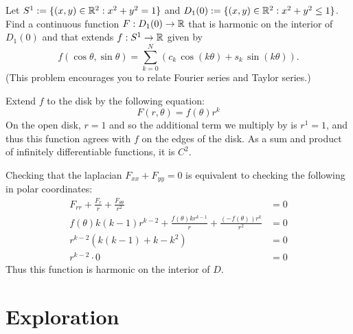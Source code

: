 \documentclass{homework}
\begin{document}
        \begin{problem}\label{relate-fourier-and-taylor-series}Let $S^1 := \{(x,y) \in \mathbb{R}^2 : x^2 + y^2 = 1 \}$ and $D_1(0) := \{ (x,y) \in \mathbb{R}^2 : x^2 + y^2 \leq 1 \}$.  Find a continuous function $F : D_1(0) \to \mathbb{R}$ that is harmonic on the interior of $D_1(0)$ and that extends
          $f : S^1 \to \mathbb{R}$ given by
           \[
              f(\cos \theta,\sin \theta) = \sum_{k=0}^N \left(c_k \, \cos \left( k\theta \right) + s_k \, \sin \left( k \theta \right) \right).
               \]
                (This problem encourages you to relate Fourier series and Taylor series.)
                \end{problem}
                \begin{solution}
                Extend $f$ to the disk by the following equation:
                \[
                F(r, \theta) = f(\theta)r^{k}
                \]
                On the open disk, $r=1$ and so the additional term we multiply by is $r^1=1$, and thus this function agrees with $f$ on the edges of the disk. As a sum and product of infinitely differentiable functions, it is $C^2$.

                Checking that the laplacian $F_{xx} + F_{yy} = 0$ is equivalent to checking the following in polar coordinates:
                \begin{align*}
                F_{rr} +  \frac{F_r}{r} + \frac{F_{\theta\theta}}{r^2} &= 0\\
                f(\theta)k(k-1)r^{k-2} +  \frac{f(\theta)kr^{k-1}}{r} + \frac{(-f(\theta))r^k}{r^2} &= 0\\
                r^{k-2}(k(k-1) +  k - k^2) &= 0\\
                r^{k-2}\cdot 0 &= 0
                \end{align*}
                Thus this function is harmonic on the interior of $D$.
                \end{solution}
                \section{Exploration}
\end{document}
